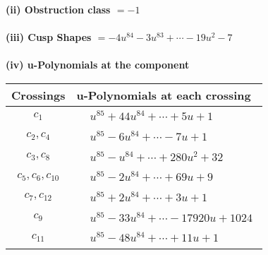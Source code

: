 \documentclass[1p]{elsarticle_modified}
\theoremstyle{definition}
\begin{document}
\flushleft \textbf{(ii) Obstruction class $= -1$}\\~\\
\flushleft \textbf{(iii) Cusp Shapes $= -4 u^{84}-3 u^{83}+\cdots-19 u^2-7$}\\~\\
\newpage\renewcommand{\arraystretch}{1}
\flushleft \textbf{(iv) u-Polynomials at the component}\newline \\
\begin{tabular}{m{50pt}|m{274pt}}
Crossings & \hspace{64pt}u-Polynomials at each crossing \\
\hline $$\begin{aligned}c_{1}\end{aligned}$$&$\begin{aligned}
&u^{85}+44 u^{84}+\cdots+5 u+1
\end{aligned}$\\
\hline $$\begin{aligned}c_{2},c_{4}\end{aligned}$$&$\begin{aligned}
&u^{85}-6 u^{84}+\cdots-7 u+1
\end{aligned}$\\
\hline $$\begin{aligned}c_{3},c_{8}\end{aligned}$$&$\begin{aligned}
&u^{85}- u^{84}+\cdots+280 u^2+32
\end{aligned}$\\
\hline $$\begin{aligned}c_{5},c_{6},c_{10}\end{aligned}$$&$\begin{aligned}
&u^{85}-2 u^{84}+\cdots+69 u+9
\end{aligned}$\\
\hline $$\begin{aligned}c_{7},c_{12}\end{aligned}$$&$\begin{aligned}
&u^{85}+2 u^{84}+\cdots+3 u+1
\end{aligned}$\\
\hline $$\begin{aligned}c_{9}\end{aligned}$$&$\begin{aligned}
&u^{85}-33 u^{84}+\cdots-17920 u+1024
\end{aligned}$\\
\hline $$\begin{aligned}c_{11}\end{aligned}$$&$\begin{aligned}
&u^{85}-48 u^{84}+\cdots+11 u+1
\end{aligned}$\\
\hline
\end{tabular}\\~\\
\end{document}
